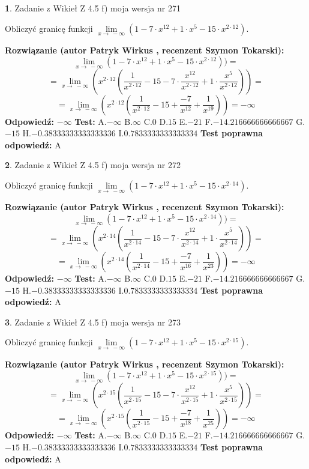 \documentclass[12pt, a4paper]{article}
\theoremstyle{definition} %
\newtheorem{zad}{}
\newcommand{\zadStart}[1]{\begin{zad}#1\newline}
\newcommand{\zadStop}{\end{zad}}
\newcommand{\rozwStart}[2]{\noindent \textbf{Rozwiązanie (autor #1 , recenzent #2): }\newline}
\newcommand{\rozwStop}{\newline}
\newcommand{\odpStart}{\noindent \textbf{Odpowiedź:}\newline}
\newcommand{\odpStop}{\newline}
\newcommand{\testStart}{\noindent \textbf{Test:}\newline}
\newcommand{\testStop}{\newline}
\newcommand{\kluczStart}{\noindent \textbf{Test poprawna odpowiedź:}\newline}
\newcommand{\kluczStop}{\newline}
\begin{document}
\zadStart{Zadanie z Wikieł Z 4.5 f) moja wersja nr 271}


Obliczyć granicę funkcji  $\lim\limits_{x\to\ -\infty}(1 - 7 \cdot x^{12}+1 \cdot x^{5}- 15 \cdot x^{2\cdot12})$.
\zadStop
\rozwStart{Patryk Wirkus}{Szymon Tokarski}
$$\lim\limits_{x\to\ -\infty}(1 - 7 \cdot x^{12}+1 \cdot x^{5}- 15 \cdot x^{2\cdot12}))=$$
$$=\lim\limits_{x\to\ -\infty}(x^{2\cdot12}(\frac{1}{x^{2\cdot12}}-15 -7 \cdot \frac{x^{12}}{x^{2\cdot12}}+1 \cdot \frac{x^{5}}{x^{2\cdot12}}))=$$
$$=\lim\limits_{x\to\ -\infty}(x^{2\cdot12}(\frac{1}{x^{2\cdot12}}-15 + \frac{-7}{x^{12}}+ \frac{1}{x^{19}}))=-\infty$$
\rozwStop
\odpStart
$-\infty$
\odpStop
\testStart
A.$-\infty$ B.$\infty$ C.$0$ D.$15$ E.$-21$
F.$-14.216666666666667$ G.$-15$
H.$-0.38333333333333336$
I.$0.7833333333333334$
\testStop
\kluczStart
A
\kluczStop



\zadStart{Zadanie z Wikieł Z 4.5 f) moja wersja nr 272}


Obliczyć granicę funkcji  $\lim\limits_{x\to\ -\infty}(1 - 7 \cdot x^{12}+1 \cdot x^{5}- 15 \cdot x^{2\cdot14})$.
\zadStop
\rozwStart{Patryk Wirkus}{Szymon Tokarski}
$$\lim\limits_{x\to\ -\infty}(1 - 7 \cdot x^{12}+1 \cdot x^{5}- 15 \cdot x^{2\cdot14}))=$$
$$=\lim\limits_{x\to\ -\infty}(x^{2\cdot14}(\frac{1}{x^{2\cdot14}}-15 -7 \cdot \frac{x^{12}}{x^{2\cdot14}}+1 \cdot \frac{x^{5}}{x^{2\cdot14}}))=$$
$$=\lim\limits_{x\to\ -\infty}(x^{2\cdot14}(\frac{1}{x^{2\cdot14}}-15 + \frac{-7}{x^{16}}+ \frac{1}{x^{23}}))=-\infty$$
\rozwStop
\odpStart
$-\infty$
\odpStop
\testStart
A.$-\infty$ B.$\infty$ C.$0$ D.$15$ E.$-21$
F.$-14.216666666666667$ G.$-15$
H.$-0.38333333333333336$
I.$0.7833333333333334$
\testStop
\kluczStart
A
\kluczStop



\zadStart{Zadanie z Wikieł Z 4.5 f) moja wersja nr 273}


Obliczyć granicę funkcji  $\lim\limits_{x\to\ -\infty}(1 - 7 \cdot x^{12}+1 \cdot x^{5}- 15 \cdot x^{2\cdot15})$.
\zadStop
\rozwStart{Patryk Wirkus}{Szymon Tokarski}
$$\lim\limits_{x\to\ -\infty}(1 - 7 \cdot x^{12}+1 \cdot x^{5}- 15 \cdot x^{2\cdot15}))=$$
$$=\lim\limits_{x\to\ -\infty}(x^{2\cdot15}(\frac{1}{x^{2\cdot15}}-15 -7 \cdot \frac{x^{12}}{x^{2\cdot15}}+1 \cdot \frac{x^{5}}{x^{2\cdot15}}))=$$
$$=\lim\limits_{x\to\ -\infty}(x^{2\cdot15}(\frac{1}{x^{2\cdot15}}-15 + \frac{-7}{x^{18}}+ \frac{1}{x^{25}}))=-\infty$$
\rozwStop
\odpStart
$-\infty$
\odpStop
\testStart
A.$-\infty$ B.$\infty$ C.$0$ D.$15$ E.$-21$
F.$-14.216666666666667$ G.$-15$
H.$-0.38333333333333336$
I.$0.7833333333333334$
\testStop
\kluczStart
A
\kluczStop
\end{document}
